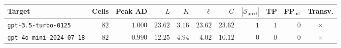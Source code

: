 \small
\setlength{\tabcolsep}{4pt}
\begin{tabular}{lrrrrrrrrrc}
\toprule
Target                           & Cells & Peak AD & $L$     & $K$    & $\ell$  & $G$     & $|\mathcal{S}_{\mathrm{pred}}|$ & TP & FP$_{\mathrm{int}}$ & Transv. \\
\midrule
\texttt{gpt-3.5-turbo-0125}      & $82$  & $1.000$ & $23.62$ & $3.16$ & $23.62$ & $23.62$ & $1$ & $1$ & $0$ & $\times$ \\
\texttt{gpt-4o-mini-2024-07-18}  & $82$  & $0.990$ & $12.25$ & $4.94$ & $ 4.02$ & $10.12$ & $0$ & $0$ & $0$ & $\times$ \\
\bottomrule
\end{tabular}
